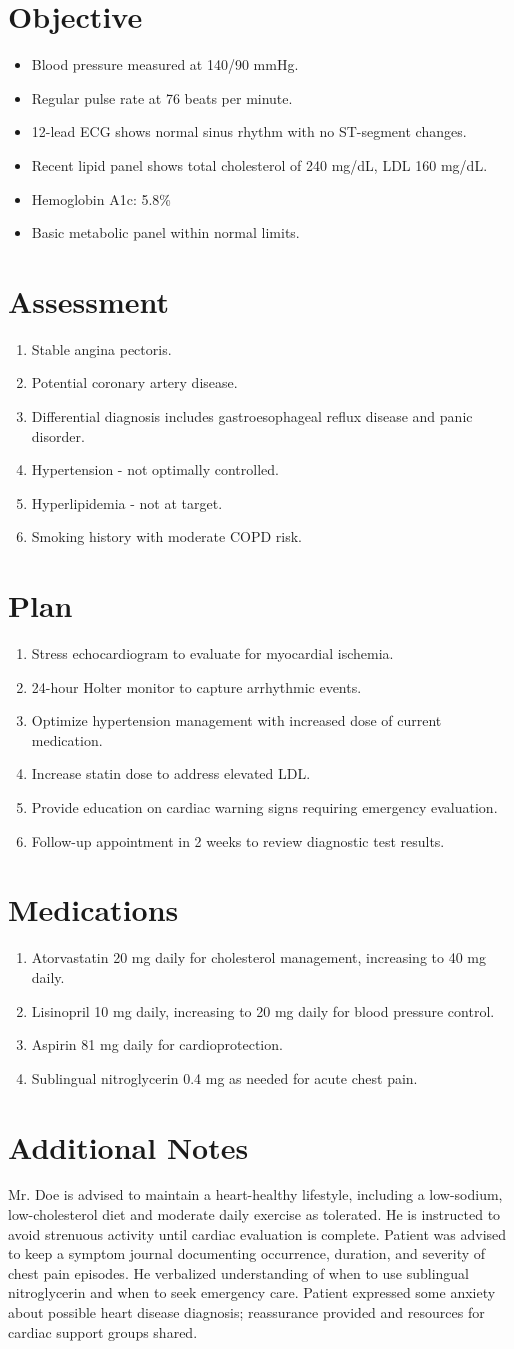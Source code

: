 \documentclass[letterpaper,11pt]{article}
\newcommand{\paragraphSection}[2]{
  \section{#1}
  \vspace{-0.2cm}
  \begin{justify}
    #2
  \end{justify}
  \vspace{0.4cm}
}
\newcommand{\bulletSection}[2]{
  \section{#1}
  \vspace{-0.2cm}
  \begin{itemize}[leftmargin=0.5cm, label={\small\textbullet}, itemsep=0pt]
    #2
  \end{itemize}
  \vspace{0.4cm}
}
\newcommand{\numberedSection}[2]{
  \section{#1}
  \vspace{-0.2cm}
  \begin{enumerate}[leftmargin=0.7cm, label=\arabic*., itemsep=0pt]
    #2
  \end{enumerate}
  \vspace{0.4cm}
}
\newcommand{\bulletItem}[1]{
  \item #1
}
\newcommand{\numberedItem}[1]{
  \item #1
}
\begin{document}
\bulletSection{Objective}{
  \bulletItem{Blood pressure measured at 140/90 mmHg.}
  \bulletItem{Regular pulse rate at 76 beats per minute.}
  \bulletItem{12-lead ECG shows normal sinus rhythm with no ST-segment changes.}
  \bulletItem{Recent lipid panel shows total cholesterol of 240 mg/dL, LDL 160 mg/dL.}
  \bulletItem{Hemoglobin A1c: 5.8\%}
  \bulletItem{Basic metabolic panel within normal limits.}
}

\numberedSection{Assessment}{
  \numberedItem{Stable angina pectoris.}
  \numberedItem{Potential coronary artery disease.}
  \numberedItem{Differential diagnosis includes gastroesophageal reflux disease and panic disorder.}
  \numberedItem{Hypertension - not optimally controlled.}
  \numberedItem{Hyperlipidemia - not at target.}
  \numberedItem{Smoking history with moderate COPD risk.}
}

\numberedSection{Plan}{
  \numberedItem{Stress echocardiogram to evaluate for myocardial ischemia.}
  \numberedItem{24-hour Holter monitor to capture arrhythmic events.}
  \numberedItem{Optimize hypertension management with increased dose of current medication.}
  \numberedItem{Increase statin dose to address elevated LDL.}
  \numberedItem{Provide education on cardiac warning signs requiring emergency evaluation.}
  \numberedItem{Follow-up appointment in 2 weeks to review diagnostic test results.}
}

\numberedSection{Medications}{
  \numberedItem{Atorvastatin 20 mg daily for cholesterol management, increasing to 40 mg daily.}
  \numberedItem{Lisinopril 10 mg daily, increasing to 20 mg daily for blood pressure control.}
  \numberedItem{Aspirin 81 mg daily for cardioprotection.}
  \numberedItem{Sublingual nitroglycerin 0.4 mg as needed for acute chest pain.}
}

\paragraphSection{Additional Notes}{
  Mr. Doe is advised to maintain a heart-healthy lifestyle, including a low-sodium, low-cholesterol diet and moderate daily exercise as tolerated. He is instructed to avoid strenuous activity until cardiac evaluation is complete. Patient was advised to keep a symptom journal documenting occurrence, duration, and severity of chest pain episodes. He verbalized understanding of when to use sublingual nitroglycerin and when to seek emergency care. Patient expressed some anxiety about possible heart disease diagnosis; reassurance provided and resources for cardiac support groups shared.
}
\end{document}
